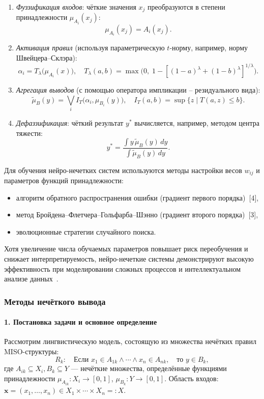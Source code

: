 \begin{enumerate}
  \item \emph{Фуззификация входов}:
    чёткие значения \(x_j\) преобразуются в степени принадлежности
    \(\mu_{A_i}(x_j)\):
    \[
      \mu_{A_i}(x_j) = A_i(x_j).
    \]
  \item \emph{Активация правил} (используя параметрическую \(t\)-норму,
    например, норму Швейцера–Склэра):
    \[
      \alpha_i
      = T_{\lambda}\bigl(\mu_{A_i}(x)\bigr),
      \quad
      T_{\lambda}(a,b)
      = \max\!\bigl(0,\;1-[(1-a)^\lambda + (1-b)^\lambda]^{1/\lambda}\bigr).
    \]
  \item \emph{Агрегация выводов} (с помощью оператора импликации –
    резидуального вида):
    \[
      \tilde{\mu}_B(y)
      = \bigvee_i I_T\bigl(\alpha_i,\mu_{B_i}(y)\bigr),
      \quad
      I_T(a,b)
      = \sup\{z\mid T(a,z)\le b\}.
    \]
  \item \emph{Дефаззификация}: чёткий результат \(y^*\) вычисляется, например,
    методом центра тяжести:
    \[
      y^*
      = \frac{\displaystyle \int y\,\tilde{\mu}_B(y)\,dy}
             {\displaystyle \int \tilde{\mu}_B(y)\,dy}.
    \]
\end{enumerate}

Для обучения нейро-нечетких систем используются методы настройки
весов \(w_{ij}\) и параметров функций принадлежности:
\begin{itemize}
  \item алгоритм обратного распространения ошибки (градиент первого порядка)~[4],
  \item метод Бройдена–Флетчера–Гольфарба–Шэнно (градиент второго порядка)~[3],
  \item эволюционные стратегии случайного поиска.
\end{itemize}

Хотя увеличение числа обучаемых параметров повышает риск переобучения и
снижает интерпретируемость, нейро-нечеткие системы демонстрируют высокую
эффективность при моделировании сложных процессов и интеллектуальном
анализе данных~.


\subsubsection{Методы нечёткого вывода}

\paragraph{1. Постановка задачи и основное определение}
Рассмотрим лингвистическую модель, состоящую из множества нечётких правил MISO-структуры:
\begin{equation}
  R_k:\quad
  \text{Если }x_1\in A_{1k}\wedge\cdots\wedge x_n\in A_{nk},\quad
  \text{то }y\in B_k,
  \label{eq:rule_general}
\end{equation}
где $A_{ik}\subseteq X_i, B_k\subseteq Y$ — нечёткие множества,
определённые функциями принадлежности
$\mu_{A_{ik}}:X_i\to[0,1]$, $\mu_{B_k}:Y\to[0,1]$.
Область входов: $\mathbf{x}=(x_1,\dots,x_n)\in X_1\times\cdots\times X_n=:X$.

